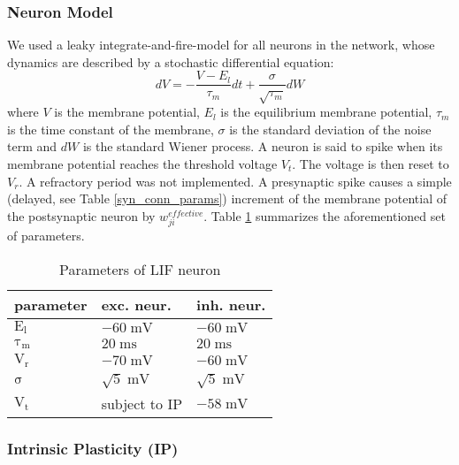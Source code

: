 \documentclass[10pt,a4paper]{article}
\begin{document}
\subsubsection{Neuron Model}

We used a leaky integrate-and-fire-model for all neurons in the network, whose dynamics are described by a stochastic differential equation:
\begin{equation}
dV = -\frac{V-E_l}{\tau_m}dt + \frac{\sigma}{\sqrt{\tau_m}}dW
\end{equation}
where $V$ is the membrane potential, $E_l$ is the equilibrium membrane potential, $\tau_m$ is the time constant of the membrane, $\sigma$ is the standard deviation of the noise term and $dW$ is the standard Wiener process. A neuron is said to spike when its membrane potential reaches the threshold voltage $V_t$. The voltage is then reset to $V_r$. A refractory period was not implemented. A presynaptic spike causes a simple (delayed, see Table \ref{syn_conn_params}) increment of the membrane potential of the postsynaptic neuron by $w^{effective}_{ji}$. Table \ref{LIF_neuron_params} summarizes the aforementioned set of parameters.
\begin{table}
\begin{tabular}{|l|l|l|}
\hline
\textbf{parameter} & \textbf{exc. neur.} & \textbf{inh. neur.}\\ \hline
$\mathrm{E_l}$ & $\mathrm{-60\;mV}$ & $\mathrm{-60\;mV}$ \\ \hline
$\mathrm{\tau_m}$ & $\mathrm{20\;ms}$ & $\mathrm{20\;ms}$ \\ \hline
$\mathrm{V_r}$ & $\mathrm{-70\;mV}$ & $\mathrm{-60\;mV}$ \\ \hline
$\mathrm{\sigma}$ & $\mathrm{\sqrt{5}\;mV}$ & $\mathrm{\sqrt{5}\;mV}$ \\ \hline
$\mathrm{V_t}$ & subject to IP & $\mathrm{-58\;mV}$ \\ 
\hline
\end{tabular}
\caption{Parameters of LIF neuron}
\label{LIF_neuron_params}
\end{table}   

\subsubsection{Intrinsic Plasticity (IP)}
\end{document}
